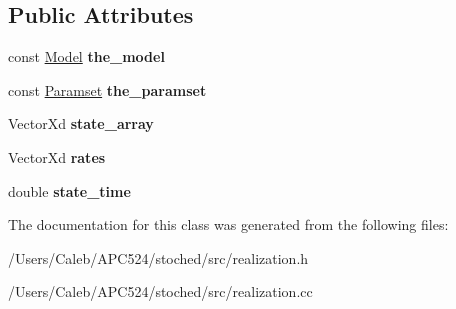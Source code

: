 \subsection*{Public Attributes}
\begin{DoxyCompactItemize}
\item 
\mbox{\label{class_realization_aaf38f4ab6d7286c35942308bc78b38db}} 
const \hyperlink{class_model}{Model} {\bfseries the\+\_\+model}
\item 
\mbox{\label{class_realization_a119bb29de88929bc51bc1b329473a94b}} 
const \hyperlink{class_paramset}{Paramset} {\bfseries the\+\_\+paramset}
\item 
\mbox{\label{class_realization_a2ab61502cfab8dfe643d976d735163a9}} 
Vector\+Xd {\bfseries state\+\_\+array}
\item 
\mbox{\label{class_realization_ae91425d8eacea1f0374b8f0f7f57347b}} 
Vector\+Xd {\bfseries rates}
\item 
\mbox{\label{class_realization_a7c4def45c4833072317517b71e723793}} 
double {\bfseries state\+\_\+time}
\end{DoxyCompactItemize}


The documentation for this class was generated from the following files\+:\begin{DoxyCompactItemize}
\item 
/\+Users/\+Caleb/\+A\+P\+C524/stoched/src/realization.\+h\item 
/\+Users/\+Caleb/\+A\+P\+C524/stoched/src/realization.\+cc\end{DoxyCompactItemize}

